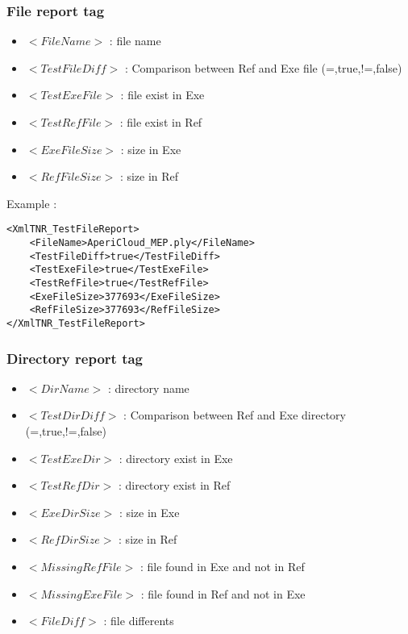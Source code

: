 \documentclass[a4paper]{book}
\begin{document}
\subsubsection{File report tag}
\begin{itemize}
\item $<FileName>$ : file name
\item $<TestFileDiff>$ : Comparison between Ref and Exe file (=,true,!=,false)
\item $<TestExeFile>$ : file exist in Exe
\item $<TestRefFile>$ : file exist in Ref
\item $<ExeFileSize>$ : size in Exe
\item $<RefFileSize>$ : size in Ref\\
\end{itemize}

Example : 
\begin{lstlisting}
<XmlTNR_TestFileReport>
	<FileName>AperiCloud_MEP.ply</FileName>
	<TestFileDiff>true</TestFileDiff>
	<TestExeFile>true</TestExeFile>
	<TestRefFile>true</TestRefFile>
	<ExeFileSize>377693</ExeFileSize>
	<RefFileSize>377693</RefFileSize>
</XmlTNR_TestFileReport>
\end{lstlisting}

\subsubsection{Directory report tag}
\begin{itemize}
\item $<DirName>$ : directory name
\item $<TestDirDiff>$ : Comparison between Ref and Exe directory (=,true,!=,false)
\item $<TestExeDir>$ : directory exist in Exe
\item $<TestRefDir>$ : directory exist in Ref
\item $<ExeDirSize>$ : size in Exe
\item $<RefDirSize>$ : size in Ref
\item $<MissingRefFile>$ : file found in Exe and not in Ref
\item $<MissingExeFile>$ : file found in Ref and not in Exe
\item $<FileDiff>$ : file differents
\end{itemize}
\end{document}
